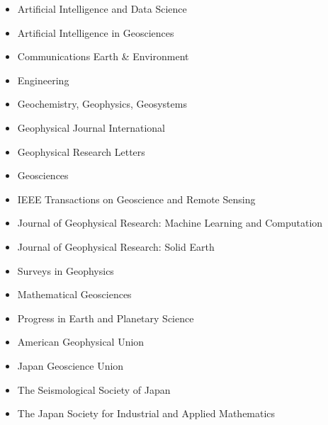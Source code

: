 \begin{small} \color{black}


\begin{itemize}
\item Artificial Intelligence and Data Science
\item Artificial Intelligence in Geosciences
\item Communications Earth \& Environment
\item Engineering
\item Geochemistry, Geophysics, Geosystems
\item Geophysical Journal International
\item Geophysical Research Letters
\item Geosciences
\item IEEE Transactions on Geoscience and Remote Sensing
\item Journal of Geophysical Research: Machine Learning and Computation
\item Journal of Geophysical Research: Solid Earth
\item Surveys in Geophysics
\item Mathematical Geosciences
\item Progress in Earth and Planetary Science
\end{itemize}

\end{small}


\begin{small} \color{black}

\begin{itemize}
\item American Geophysical Union
\item Japan Geoscience Union
\item The Seismological Society of Japan
\item The Japan Society for Industrial and Applied Mathematics
\end{itemize}

\end{small}
